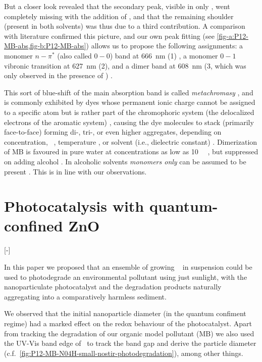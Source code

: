 \documentclass[webedition,openright,titles,swedish,english]{LuaUUThesis}\usepackage[]{graphicx}\usepackage[]{xcolor}
\newcommand{\ie}{i.e.}
\newcommand{\cf}{c.f.}
\begin{document}
But a closer look revealed that the secondary peak, visible in only \water, went
completely missing with the addition of \EtOH, and that the remaining shoulder
(present in both solvents) was thus due to a third contribution.
A comparison with literature confirmed this picture, and our own peak fitting
(see \cref{fig-a:P12-MB-abs,fig-b:P12-MB-abs}) allows us to propose the following
assignments:
a monomer $n-\pi^\ast$ (also called $0-0$) band at \qty{666}{\nm} (\textsf{1}) \cite{Bergmann1963,Cenens1988},
a monomer $0-1$ vibronic transition at \qty{627}{\nm} (\textsf{2}), and
a dimer band at \qty{608}{\nm} (\textsf{3}, which was only observed
in the presence of \EtOH) \cite{Ruprecht1984}.

This sort of blue-shift of the main absorption band is called \emph{metachromasy} \cite{Cenens1988},
and is commonly exhibited by dyes whose permanent ionic charge cannot be assigned
to a specific atom but is rather part of the
chromophoric system (the delocalized electrons of the aromatic system) \cite{Schubert1955},
causing the dye molecules to stack (primarily face-to-face) forming di-, tri-, or
even higher aggregates, depending on concentration, \pH\ \cite{Singhal1967}, temperature \cite{Heger2005},
or solvent (\ie, dielectric constant) \cite{Schubert1955,Lewis1943,Braswell1968,Bergmann1963,Ruprecht1984,Fornili1981,Mahmood2013}.
Dimerization of \Gls{MB} is favoured in pure water at concentrations as
low as \qty{10}{\micro\Molar} \cite{Cenens1988}, but suppressed on adding alcohol \cite{Blandamer1967}.
In alcoholic solvents \emph{monomers only} can be assumed to be present \cite{Fornili1981,West1965,Blandamer1967}.
This is in line with our observations.



% 

\section{Photocatalysis with quantum-confined ZnO}
\label{results:P12-ZnO-QDs-PC}
[-\baselineskip]

In this paper we proposed that an ensemble of growing \ZnO\  in suspension could be
used to photodegrade an environmental pollutant using just sunlight, with
the nanoparticulate photocatalyst and the degradation products naturally aggregating
into a comparatively harmless sediment.

We observed that the initial nanoparticle diameter (in the quantum confiment regime)
had a marked effect on the redox behaviour of the photocatalyst. Apart from tracking
the degradation of our organic model pollutant (\gls{MB}) we also used the \gls{UV-Vis}
band edge of \ZnO\ to track the band gap and derive the particle diameter
(\cf\ \cref{fig:P12-MB-N04H-small-nostir-photodegradation}), among other things.
\end{document}
